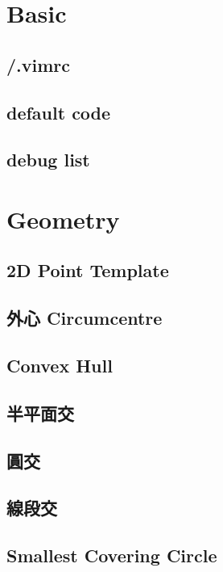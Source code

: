 \section{Basic}

\subsection{/.vimrc}

\subsection{default code}

\subsection{debug list}


\section{Geometry}

\subsection{2D Point Template}

\subsection{外心 Circumcentre}

\subsection{Convex Hull}

\subsection{半平面交}

\subsection{圓交}

\subsection{線段交}

\subsection{Smallest Covering Circle}


